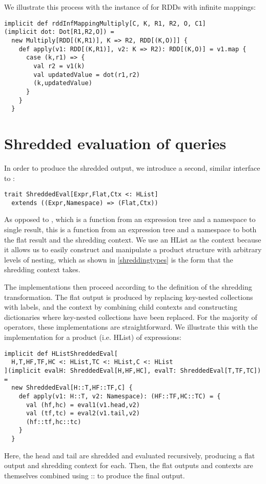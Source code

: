 \vs
We illustrate this process with the instance of  for RDDs with infinite mappings:
\vs\begin{lstlisting}
implicit def rddInfMappingMultiply[C, K, R1, R2, O, C1]
(implicit dot: Dot[R1,R2,O]) =
  new Multiply[RDD[(K,R1)], K => R2, RDD[(K,O)]] {
    def apply(v1: RDD[(K,R1)], v2: K => R2): RDD[(K,O)] = v1.map {
      case (k,r1) => {
        val r2 = v1(k)
        val updatedValue = dot(r1,r2)
        (k,updatedValue)
      }
    }
  }
\end{lstlisting}\vs
 
\section{Shredded evaluation of queries}

In order to produce the shredded output, we introduce a second, similar interface to :
\vs\begin{lstlisting}
trait ShreddedEval[Expr,Flat,Ctx <: HList]
  extends ((Expr,Namespace) => (Flat,Ctx))
\end{lstlisting}\vs
As opposed to , which is a function from an expression tree and a namespace to single result, this is a function from an expression tree and a namespace to both the flat result and the shredding context. We use an HList as the context because it allows us to easily construct and manipulate a product structure with arbitrary levels of nesting, which as shown in \ref{shreddingtypes} is the form that the shredding context takes.

The implementations then proceed according to the definition of the shredding transformation. The flat output is produced by replacing key-nested collections with labels, and the context by combining child contexts and constructing dictionaries where key-nested collections have been replaced. For the majority of operators, these implementations are straightforward. We illustrate this with the implementation for a product (i.e. HList) of expressions:
\vs\begin{lstlisting}
implicit def HListShreddedEval[
  H,T,HF,TF,HC <: HList,TC <: HList,C <: HList
](implicit evalH: ShreddedEval[H,HF,HC], evalT: ShreddedEval[T,TF,TC]) =
  new ShreddedEval[H::T,HF::TF,C] {
    def apply(v1: H::T, v2: Namespace): (HF::TF,HC::TC) = {
      val (hf,hc) = eval1(v1.head,v2)
      val (tf,tc) = eval2(v1.tail,v2)
      (hf::tf,hc::tc)
    }
  }
\end{lstlisting}\vs
Here, the head and tail are shredded and evaluated recursively, producing a flat output and shredding context for each. Then, the flat outputs and contexts are themselves combined using :: to produce the final output.

